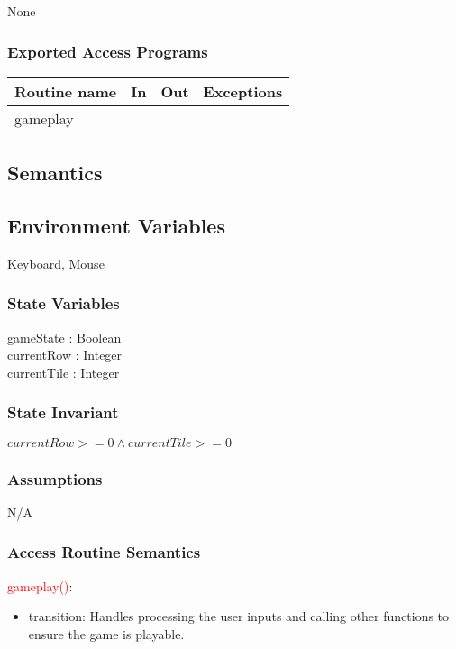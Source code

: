 \documentclass[12pt]{article}
\begin{document}
None

\subsubsection* {Exported Access Programs}

\begin{tabular}{| l | l | l | p{6cm} |}
\hline
\textbf{Routine name} & \textbf{In} & \textbf{Out} & \textbf{Exceptions}\\
\hline
gameplay & ~ & ~ &  \\
\hline
\end{tabular}

\subsection* {Semantics}

\subsection*{Environment Variables}

Keyboard, Mouse

\subsubsection* {State Variables}

gameState : Boolean \\
currentRow : Integer \\
currentTile : Integer

\subsubsection* {State Invariant}

$currentRow >= 0 \wedge currentTile >= 0$

\subsubsection* {Assumptions}

N/A

\subsubsection* {Access Routine Semantics}

\noindent \textcolor{red}{gameplay()}:
\begin{itemize}
	\item transition: Handles processing the user inputs and calling other functions to ensure the game is playable.
\end{itemize}
\end{document}
